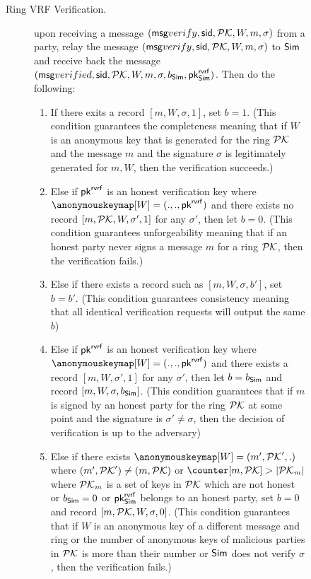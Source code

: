\begin{figure}
\begin{tcolorbox}
{\begin{description}
				\item[Ring VRF Verification.] upon receiving a message $(\mathsf{msg}{verify}, \textsf{sid}, {\mathcal{PK}},W, m, \sigma)$ from a party, relay the message $(\mathsf{msg}{verify}, \textsf{sid}, {\mathcal{PK}},W, m, \sigma)$ to $ \mathsf{Sim} $ and receive back the message $(\mathsf{msg}{verified}, \textsf{sid}, {\mathcal{PK}},W, m, \sigma, b_{\mathsf{Sim}}, \mathsf{pk}^{\mathsf{rvrf}}_{\mathsf{Sim}})$. Then do the following: 
				\begin{enumerate}[label={{Cond.-} }{{\arabic*}}, start = 1]
					\item If there exits a record $ [m,W,\sigma, 1] $, set $ b = 1 $. (This condition guarantees the completeness meaning that if  $ W $ is an anonymous key that is generated for the ring $ {\mathcal{PK}} $ and  the message $ m $ and the signature $ \sigma $ is legitimately generated for $ m, W $, then the verification succeeds.)
					\item Else if $ \mathsf{pk}^{\mathsf{rvrf}}  $ is an honest verification key where $ \anonymouskeymap[W] = (.,., \pkrvrf) $ and there exists no record $ [m, {\mathcal{PK}}, W, \sigma', 1] $ for any $ \sigma' $, then let $ b= 0  $.
					(This condition guarantees unforgeability meaning that if an honest party never signs a message $ m $ for a ring $ {\mathcal{PK}} $, then the verification fails.)\label{cond:forgery}
					\item Else if there exists a record  such as $ [m,W,\sigma, b'] $, set $ b = b' $. (This condition guarantees consistency meaning that all identical verification requests will output the same $ b $) \label{cond:consistency}
					\item Else if $ \mathsf{pk}^{\mathsf{rvrf}}  $ is an honest verification key where $ \anonymouskeymap[W] = (.,., \pkrvrf) $ and there exists a record $ [m, W, \sigma', 1] $ for any $ \sigma' $, then let $ b= b_{\mathsf{Sim}} $ and record $ [m, W,\sigma, b_{\mathsf{Sim}}] $. (This condition guarantees that if $ m $ is signed by an honest party for the ring $ {\mathcal{PK}} $ at some point and the signature is $ \sigma' \neq \sigma $, then the decision of verification is up to the adversary) \label{cond:differentsignature}
					\item \label{cond:forgerymalicious}Else if there exists $ \anonymouskeymap[W] = (m', \pkring',.)  $ where $ (m', {\mathcal{PK}}') \neq (m, {\mathcal{PK}}) $ or $ \counter[m, \pkring] > |\pkring_m| $ where $ {\mathcal{PK}}_m $ is a set of keys in $ {\mathcal{PK}} $ which are not honest or $ b_{\mathsf{Sim}} = 0 $ or $ \mathsf{pk}^{\mathsf{rvrf}}_{\mathsf{Sim}} $ belongs to an honest party, set $ b = 0 $ and record $ [m, {\mathcal{PK}},W,\sigma, 0] $. (This condition guarantees that if $ W $ is an anonymous key of a different message and ring or the number of anonymous keys of malicious parties in $ {\mathcal{PK}} $ is more than their number or     $ \mathsf{Sim} $ does not verify $ \sigma $, then the verification fails.)

\end{enumerate}
\end{description}}
\end{tcolorbox}
\end{figure}
